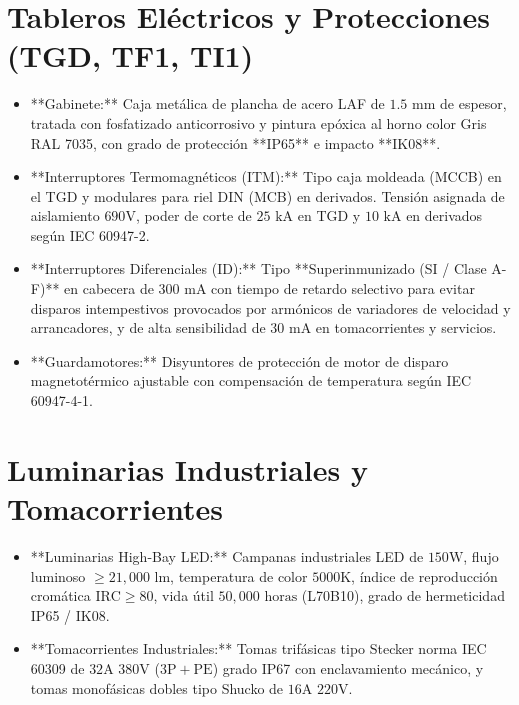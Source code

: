 \section{Tableros Eléctricos y Protecciones (TGD, TF1, TI1)}
\begin{itemize}
    \item **Gabinete:** Caja metálica de plancha de acero LAF de $1.5\text{ mm}$ de espesor, tratada con fosfatizado anticorrosivo y pintura epóxica al horno color Gris RAL 7035, con grado de protección **IP65** e impacto **IK08**.
    \item **Interruptores Termomagnéticos (ITM):** Tipo caja moldeada (MCCB) en el TGD y modulares para riel DIN (MCB) en derivados. Tensión asignada de aislamiento $690\text{V}$, poder de corte de $25\text{ kA}$ en TGD y $10\text{ kA}$ en derivados según IEC 60947-2.
    \item **Interruptores Diferenciales (ID):** Tipo **Superinmunizado (SI / Clase A-F)** en cabecera de $300\text{ mA}$ con tiempo de retardo selectivo para evitar disparos intempestivos provocados por armónicos de variadores de velocidad y arrancadores, y de alta sensibilidad de $30\text{ mA}$ en tomacorrientes y servicios.
    \item **Guardamotores:** Disyuntores de protección de motor de disparo magnetotérmico ajustable con compensación de temperatura según IEC 60947-4-1.
\end{itemize}

\section{Luminarias Industriales y Tomacorrientes}
\begin{itemize}
    \item **Luminarias High-Bay LED:** Campanas industriales LED de $150\text{W}$, flujo luminoso $\ge 21,000\text{ lm}$, temperatura de color $5000\text{K}$, índice de reproducción cromática $\text{IRC} \ge 80$, vida útil $50,000\text{ horas}$ (L70B10), grado de hermeticidad IP65 / IK08.
    \item **Tomacorrientes Industriales:** Tomas trifásicas tipo Stecker norma IEC 60309 de $32\text{A}$ $380\text{V}$ ($3\text{P}+\text{PE}$) grado IP67 con enclavamiento mecánico, y tomas monofásicas dobles tipo Shucko de $16\text{A}$ $220\text{V}$.
\end{itemize}

